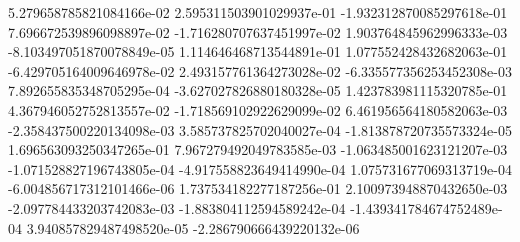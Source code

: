 5.279658785821084166e-02 2.595311503901029937e-01 -1.932312870085297618e-01 7.696672539896098897e-02 -1.716280707637451997e-02 1.903764845962996333e-03 -8.103497051870078849e-05
1.114646468713544891e-01 1.077552428432682063e-01 -6.429705164009646978e-02 2.493157761364273028e-02 -6.335577356253452308e-03 7.892655835348705295e-04 -3.627027826880180328e-05
1.423783981115320785e-01 4.367946052752813557e-02 -1.718569102922629099e-02 6.461956564180582063e-03 -2.358437500220134098e-03 3.585737825702040027e-04 -1.813878720735573324e-05
1.696563093250347265e-01 7.967279492049783585e-03 -1.063485001623121207e-03 -1.071528827196743805e-04 -4.917558823649414990e-04 1.075731677069313719e-04 -6.004856717312101466e-06
1.737534182277187256e-01 2.100973948870432650e-03 -2.097784433203742083e-03 -1.883804112594589242e-04 -1.439341784674752489e-04 3.940857829487498520e-05 -2.286790666439220132e-06

